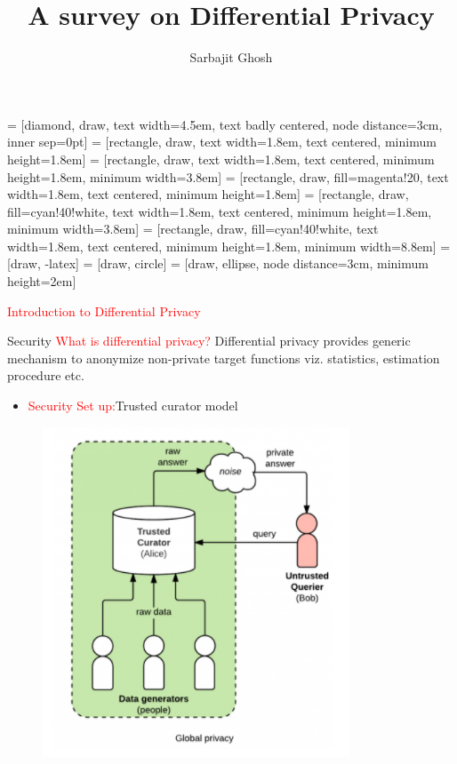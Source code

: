 \documentclass[aspectratio=169]{beamer}
\title{A survey on Differential Privacy} %
\author[Sarbajit Ghosh]{\large Sarbajit Ghosh}
\institute[ISI, Kolkata] {
\textcolor{blue}{  Under Guidence of Dr. Srimanta Bhattacharya  \\ \vspace*{1 pt}
Indian Statistical Institute, Kolkata} 
}
\date{\vspace{-5ex}} %
\newcommand{\tcr}{\textcolor{red}}
\begin{document}
	 = [diamond, draw, text width=4.5em, text badly centered, node distance=3cm, inner sep=0pt]
	 = [rectangle, draw,  text width=1.8em, text centered,  minimum height=1.8em]
	 = [rectangle, draw,  text width=1.8em, text centered,  minimum height=1.8em, minimum width=3.8em]
	 = [rectangle, draw, fill=magenta!20, text width=1.8em, text centered,  minimum height=1.8em]
	 = [rectangle, draw,  fill=cyan!40!white, text width=1.8em, text centered,  minimum height=1.8em, minimum width=3.8em]
	 = [rectangle, draw,  fill=cyan!40!white, text width=1.8em, text centered,  minimum height=1.8em, minimum width=8.8em]
	 = [draw, -latex]
	 = [draw, circle]
	 = [draw, ellipse, node distance=3cm, minimum height=2em]

\begin{frame}
\titlepage
\end{frame}

\begin{frame}
\begin{center}
\Huge \tcr{Introduction to Differential Privacy}
\end{center}
\end{frame}


\begin{frame}{Security}
\tcr{What is differential privacy?}
Differential privacy provides generic mechanism to anonymize non-private target functions viz. statistics, estimation procedure etc.
\pause
\begin{itemize}
\item \tcr{Security Set up:}Trusted curator model
\end{itemize}
\begin{figure}[!ht]
        \centering
        \includegraphics[scale=0.5]{TrustedCuratorModel.png}
        \label{fig:trusted}
\end{figure}
\end{frame}
\end{document}
